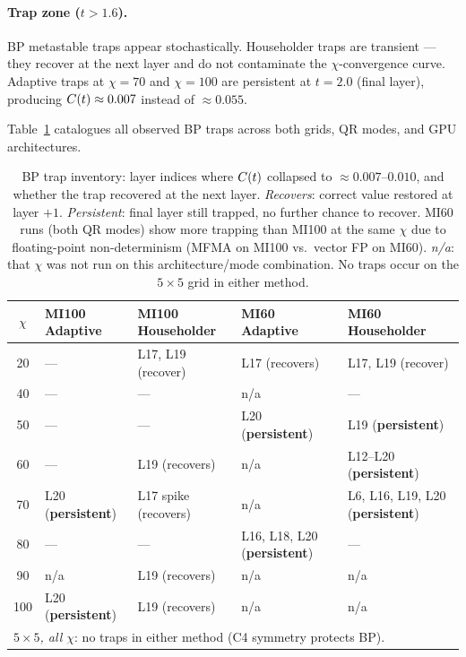 \paragraph{Trap zone ($t > 1.6$).}
BP metastable traps appear stochastically.
Householder traps are transient --- they recover at the next layer and do not
contaminate the $\chi$-convergence curve.
Adaptive traps at $\chi=70$ and $\chi=100$ are persistent at $t=2.0$
(final layer), producing $C(t) \approx 0.007$ instead of $\approx 0.055$.

Table~\ref{tab:trap_inventory} catalogues all observed BP traps across both
grids, QR modes, and GPU architectures.

\begin{table}[ht]
\centering
\caption{BP trap inventory: layer indices where $C(t)$ collapsed to
  $\approx 0.007$--$0.010$, and whether the trap recovered at the next layer.
  \emph{Recovers}: correct value restored at layer $+1$.
  \emph{Persistent}: final layer still trapped, no further chance to recover.
  MI60 runs (both QR modes) show more trapping than MI100 at the same $\chi$ due to
  floating-point non-determinism (MFMA on MI100 vs.\ vector FP on MI60).
  \emph{n/a}: that $\chi$ was not run on this architecture/mode combination.
  No traps occur on the $5\times5$ grid in either method.}
\label{tab:trap_inventory}
\small
\begin{tabular}{cllll}
\toprule
$\chi$ & MI100 Adaptive & MI100 Householder & MI60 Adaptive & MI60 Householder \\
\midrule
20  & ---                       & L17, L19 (recover)   & L17 (recovers)                       & L17, L19 (recover)                      \\
40  & ---                       & ---                  & n/a                                  & ---                                     \\
50  & ---                       & ---                  & L20 (\textbf{persistent})            & L19 (\textbf{persistent})               \\
60  & ---                       & L19 (recovers)       & n/a                                  & L12--L20 (\textbf{persistent})          \\
70  & L20 (\textbf{persistent}) & L17 spike (recovers) & n/a                                  & L6, L16, L19, L20 (\textbf{persistent}) \\
80  & ---                       & ---                  & L16, L18, L20 (\textbf{persistent})  & ---                                     \\
90  & n/a                       & L19 (recovers)       & n/a                                  & n/a                                     \\
100 & L20 (\textbf{persistent}) & L19 (recovers)       & n/a                                  & n/a                                     \\
\midrule
\multicolumn{5}{l}{\emph{$5\times5$, all $\chi$}: no traps in either method (C4 symmetry protects BP).} \\
\bottomrule
\end{tabular}
\end{table}


